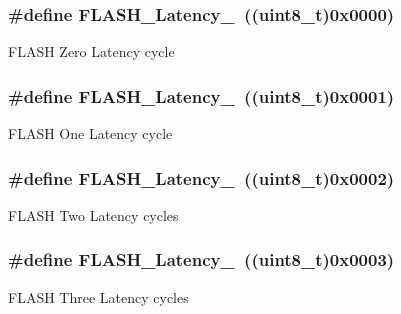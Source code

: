 \subsubsection[{F\+L\+A\+S\+H\+\_\+\+Latency\+\_\+0}]{\setlength{\rightskip}{0pt plus 5cm}\#define F\+L\+A\+S\+H\+\_\+\+Latency\+\_~((uint8\+\_\+t)0x0000)}\label{group___flash___latency_ga09afe6e52b819cc074f6111ec42ac3c3}
F\+L\+A\+S\+H Zero Latency cycle \hypertarget{group___flash___latency_ga6b7281665340fe8f7919bdfcfd06f8e6}{}
\subsubsection[{F\+L\+A\+S\+H\+\_\+\+Latency\+\_\+1}]{\setlength{\rightskip}{0pt plus 5cm}\#define F\+L\+A\+S\+H\+\_\+\+Latency\+\_~((uint8\+\_\+t)0x0001)}\label{group___flash___latency_ga6b7281665340fe8f7919bdfcfd06f8e6}
F\+L\+A\+S\+H One Latency cycle \hypertarget{group___flash___latency_ga55173ebb5c978459ce18d5e2516e3e89}{}
\subsubsection[{F\+L\+A\+S\+H\+\_\+\+Latency\+\_\+2}]{\setlength{\rightskip}{0pt plus 5cm}\#define F\+L\+A\+S\+H\+\_\+\+Latency\+\_~((uint8\+\_\+t)0x0002)}\label{group___flash___latency_ga55173ebb5c978459ce18d5e2516e3e89}
F\+L\+A\+S\+H Two Latency cycles \hypertarget{group___flash___latency_ga13fbc5a6423848be5bf631dc437bbc3f}{}
\subsubsection[{F\+L\+A\+S\+H\+\_\+\+Latency\+\_\+3}]{\setlength{\rightskip}{0pt plus 5cm}\#define F\+L\+A\+S\+H\+\_\+\+Latency\+\_~((uint8\+\_\+t)0x0003)}\label{group___flash___latency_ga13fbc5a6423848be5bf631dc437bbc3f}
F\+L\+A\+S\+H Three Latency cycles \hypertarget{group___flash___latency_ga74a5deaec2020e484ce576925ff7de16}{}
